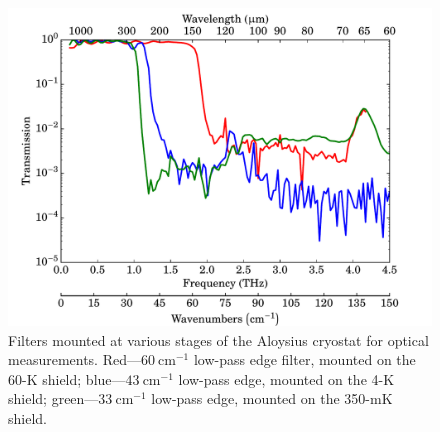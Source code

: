 \begin{figure}[tb]
\begin{center}
\includegraphics[width = 1.0\textwidth]{figures/AloysiusFilters}
\caption[Filters used for optical measurement in Aloysius]{Filters mounted at various stages of the Aloysius cryostat for optical measurements. Red---$60~\mathrm{cm}^{-1}$ low-pass edge filter, mounted on the 60-K shield; blue---$43~\mathrm{cm}^{-1}$ low-pass edge, mounted on the 4-K shield; green---$33~\mathrm{cm}^{-1}$ low-pass edge, mounted on the 350-mK shield.}
\label{fig:AloysiusFilters}
\end{center}
\end{figure}
\par 
